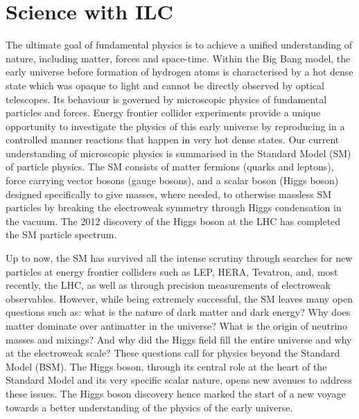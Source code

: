 \chapter{Science with ILC}
\label{chap:science}

The ultimate goal of fundamental physics is to achieve a unified understanding of nature, including matter, forces and space-time. Within the Big Bang model, the early universe before formation of hydrogen atoms is characterised by a hot dense state which was opaque to light and cannot be directly observed by optical telescopes. Its behaviour is governed by microscopic physics of fundamental particles and forces. Energy frontier collider experiments provide a unique opportunity to investigate the physics of this early universe by reproducing in a controlled manner reactions that happen in very hot dense states. Our current understanding of microscopic physics is summarised in the Standard Model (SM) of particle physics. The SM consists of matter fermions (quarks and leptons), force carrying vector bosons (gauge bosons), and a scalar boson (Higgs boson) designed specifically to give masses, where needed, to otherwise massless SM particles by breaking the electroweak symmetry through Higgs condensation in the vacuum. The 2012 discovery of the Higgs boson at the LHC has completed the SM particle spectrum. 

Up to now, the SM has survived all the intense scrutiny through searches for new particles at energy frontier colliders such as LEP, HERA, Tevatron, and, most recently, the LHC, as well as through precision measurements of electroweak observables. However, while being extremely successful, the SM leaves many open questions such as: what is the nature of dark matter and dark energy?  Why does matter dominate over antimatter in the universe? What is the origin of neutrino masses and mixings? And why did the Higgs field fill the entire universe and why at the electroweak scale? These questions call for physics beyond the Standard Model (BSM). The Higgs boson, through its central role at the heart of the Standard Model and its very specific scalar nature, opens new avenues to address these issues. The Higgs boson discovery hence marked the start of a new voyage towards a better understanding of the physics of the early universe.

